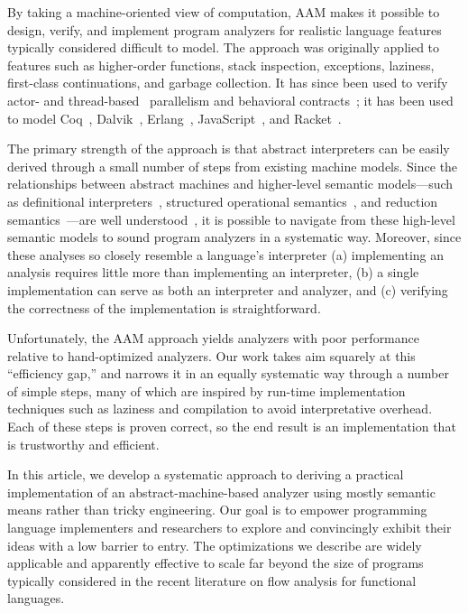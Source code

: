 \documentclass[preprint,onecolumn,9pt]{sigplanconf} %
\begin{document}
%

By taking a machine-oriented view of computation, AAM makes it possible to design, verify, and implement program analyzers for realistic language features typically considered difficult to model.
%
The approach was originally applied to features such as higher-order functions, stack inspection, exceptions, laziness, first-class continuations, and garbage collection.
%
It has since been used to verify actor-\cite{local:DOsualdo:12A} and thread-based~\cite{dvanhorn:Might2011Family} parallelism and behavioral contracts~\cite{dvanhorn:TobinHochstadt2012Higherorder};
%
it has been used to model Coq~\cite{local:harvard}, Dalvik~\cite{local:dalvik}, Erlang~\cite{local:DOsualdo:12B}, JavaScript~\cite{local:DBLP:journals/corr/abs-1109-4467}, and Racket~\cite{dvanhorn:TobinHochstadt2012Higherorder}.

The primary strength of the approach is that abstract interpreters can be easily derived through a small number of steps from existing machine models.
%
Since the relationships between abstract machines and higher-level semantic models---such as definitional interpreters~\cite{dvanhorn:reynolds-hosc98}, structured operational semantics~\cite{dvanhorn:Plotkin1981Structural}, and reduction semantics~\cite{dvanhorn:Felleisen2009Semantics}---are well understood~\cite{dvanhorn:Danvy:DSc}, it is possible to navigate from these high-level semantic models to sound program analyzers in a systematic way.
%
Moreover, since these analyses so closely resemble a language's interpreter
%
(a) implementing an analysis requires little more than implementing an interpreter,
%
(b) a single implementation can serve as both an interpreter and analyzer, and
%
(c) verifying the correctness of the implementation is straightforward.

Unfortunately, the AAM approach yields analyzers with poor performance relative to hand-optimized analyzers.
%
Our work takes aim squarely at this ``efficiency gap,'' and narrows it in an equally systematic way through a number of simple steps, many of which are inspired by run-time implementation techniques such as laziness and compilation to avoid interpretative overhead.
%
Each of these steps is proven correct, so the end result is an implementation that is trustworthy and efficient.

In this article, we develop a systematic approach to deriving a practical implementation of an abstract-machine-based analyzer using mostly semantic means rather than tricky engineering.
%
Our goal is to empower programming language implementers and researchers to explore and convincingly exhibit their ideas with a low barrier to entry.
%
The optimizations we describe are widely applicable and apparently effective to scale far beyond the size of programs typically considered in the recent literature on flow analysis for functional languages.
\end{document}

